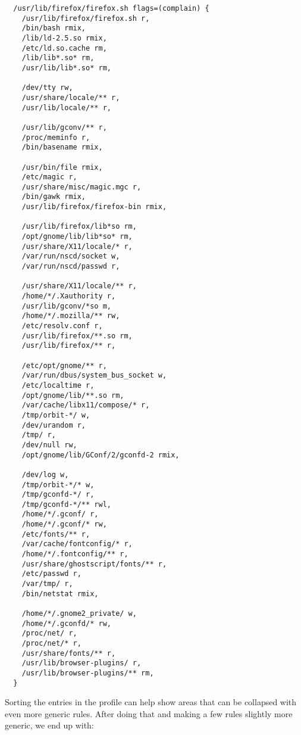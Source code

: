 \documentclass[a4paper]{article}
\begin{document}
\begin{small}
\begin{verbatim}
  /usr/lib/firefox/firefox.sh flags=(complain) {
    /usr/lib/firefox/firefox.sh r,
    /bin/bash rmix,
    /lib/ld-2.5.so rmix,
    /etc/ld.so.cache rm,
    /lib/lib*.so* rm,
    /usr/lib/lib*.so* rm,

    /dev/tty rw,
    /usr/share/locale/** r,
    /usr/lib/locale/** r,

    /usr/lib/gconv/** r,
    /proc/meminfo r,
    /bin/basename rmix,

    /usr/bin/file rmix,
    /etc/magic r,
    /usr/share/misc/magic.mgc r,
    /bin/gawk rmix,
    /usr/lib/firefox/firefox-bin rmix,

    /usr/lib/firefox/lib*so rm,
    /opt/gnome/lib/lib*so* rm,
    /usr/share/X11/locale/* r,
    /var/run/nscd/socket w,
    /var/run/nscd/passwd r,

    /usr/share/X11/locale/** r,
    /home/*/.Xauthority r,
    /usr/lib/gconv/*so m,
    /home/*/.mozilla/** rw,
    /etc/resolv.conf r,
    /usr/lib/firefox/**.so rm,
    /usr/lib/firefox/** r,

    /etc/opt/gnome/** r,
    /var/run/dbus/system_bus_socket w,
    /etc/localtime r,
    /opt/gnome/lib/**.so rm,
    /var/cache/libx11/compose/* r,
    /tmp/orbit-*/ w,
    /dev/urandom r,
    /tmp/ r,
    /dev/null rw,
    /opt/gnome/lib/GConf/2/gconfd-2 rmix,

    /dev/log w,
    /tmp/orbit-*/* w,
    /tmp/gconfd-*/ r,
    /tmp/gconfd-*/** rwl,
    /home/*/.gconf/ r,
    /home/*/.gconf/* rw,
    /etc/fonts/** r,
    /var/cache/fontconfig/* r,
    /home/*/.fontconfig/** r,
    /usr/share/ghostscript/fonts/** r,
    /etc/passwd r,
    /var/tmp/ r,
    /bin/netstat rmix,

    /home/*/.gnome2_private/ w,
    /home/*/.gconfd/* rw,
    /proc/net/ r,
    /proc/net/* r,
    /usr/share/fonts/** r,
    /usr/lib/browser-plugins/ r,
    /usr/lib/browser-plugins/** rm,
  }
\end{verbatim}
\end{small}

Sorting the entries in the profile can help show areas that can be
collapsed with even more generic rules.  After doing that and making a
few rules slightly more generic, we end up with:
\end{document}
